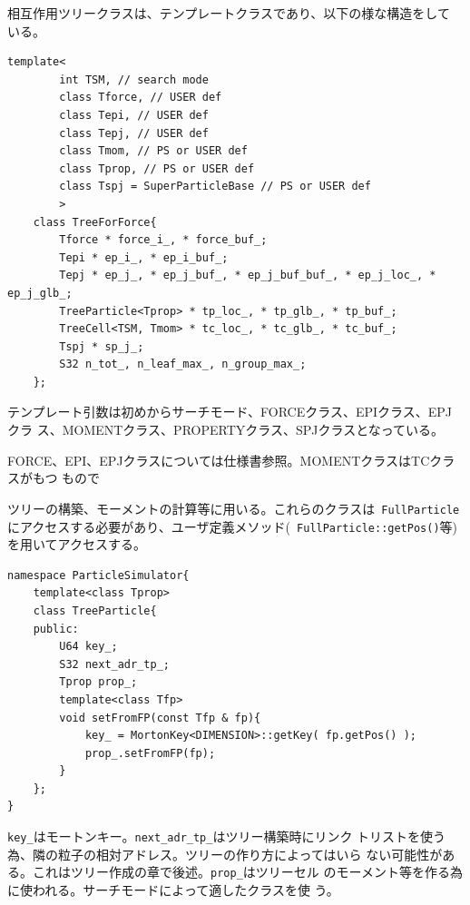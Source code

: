 


相互作用ツリークラスは、テンプレートクラスであり、以下の様な構造をして
いる。

\begin{lstlisting}[caption=相互作用ツリークラス]
    template<
        int TSM, // search mode
        class Tforce, // USER def
        class Tepi, // USER def
        class Tepj, // USER def
        class Tmom, // PS or USER def
        class Tprop, // PS or USER def
        class Tspj = SuperParticleBase // PS or USER def
        >
    class TreeForForce{
        Tforce * force_i_, * force_buf_;
        Tepi * ep_i_, * ep_i_buf_;
        Tepj * ep_j_, * ep_j_buf_, * ep_j_buf_buf_, * ep_j_loc_, * ep_j_glb_;
        TreeParticle<Tprop> * tp_loc_, * tp_glb_, * tp_buf_;
        TreeCell<TSM, Tmom> * tc_loc_, * tc_glb_, * tc_buf_;
        Tspj * sp_j_;
        S32 n_tot_, n_leaf_max_, n_group_max_;
    };
\end{lstlisting}

テンプレート引数は初めからサーチモード、FORCEクラス、EPIクラス、EPJクラ
ス、MOMENTクラス、PROPERTYクラス、SPJクラスとなっている。

FORCE、EPI、EPJクラスについては仕様書参照。MOMENTクラスはTCクラスがもつ
もので




ツリーの構築、モーメントの計算等に用いる。これらのクラスは{\tt
FullParticle}にアクセスする必要があり、ユーザ定義メソッド({\tt
FullParticle::getPos()}等)を用いてアクセスする。

\begin{lstlisting}[caption=TreeParticle]
namespace ParticleSimulator{
    template<class Tprop>
    class TreeParticle{
    public:
        U64 key_;
        S32 next_adr_tp_;
        Tprop prop_;
        template<class Tfp>
        void setFromFP(const Tfp & fp){
            key_ = MortonKey<DIMENSION>::getKey( fp.getPos() );
            prop_.setFromFP(fp);
        }
    };
}
\end{lstlisting}

{\tt key\_}はモートンキー。{\tt next\_adr\_tp\_}はツリー構築時にリンク
トリストを使う為、隣の粒子の相対アドレス。ツリーの作り方によってはいら
ない可能性がある。これはツリー作成の章で後述。{\tt prop\_}はツリーセル
のモーメント等を作る為に使われる。サーチモードによって適したクラスを使
う。

